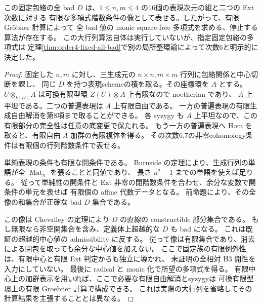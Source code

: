 \begin{corollary}[悪い中心値を与える有限代数データ]
\label{cor:order4-effective-ext-elimination}
この固定包絡の全 bad $D$ は、$1\le n,m\le4$ の16個の表現次元の組と二つの Ext 次数に対する
有限な多項式階数条件の像として表せる。したがって、有限 Gröbner 計算によって
全 bad 値の monic square-free 多項式を求める、停止する算法が存在する。
この大行列算法自体は実行していないが、指定固定包絡の多項式は
定理\ref{thm:order4-fixed-all-bad}で別の局所整環論によって次数6と明示的に決定した。
\end{corollary}
\begin{proof}
固定した $n,m$ に対し、三生成元の $n\times n,m\times m$ 行列に包絡関係と中心切断を課し、
同じ $D$ を持つ表現schemeの積を取る。その座標環を $A$ とする。
$U\otimes_{k[D]}A$ は可換有限型環 $Z(U)\otimes A$ 上有限なので noetherian であり、
$A$ 上平坦である。二つの普遍表現は $A$ 上有限自由である。
一方の普遍表現の有限生成自由解消を第8項まで取ることができる。
各 syzygy も $A$ 上平坦なので、この有限部分の完全性は任意の底変更で保たれる。
もう一方の普遍表現へ Hom を取ると、有限自由 $A$ 加群の有限複体を得る。
その次数6,7の非零cohomology条件は有限個の行列階数条件で表せる。

単純表現の条件も有限な開条件である。
Burnside の定理により、生成行列の単語が全 $\operatorname{Mat}_n$ を張ることと同値であり、
長さ $n^2-1$ までの単語を使えば足りる。
従って単純性の開条件と Ext 非零の閉階数条件を合わせ、余分な変数で開条件の単元を表せば
有限個の affine 代数データとなる。
前命題により、その全像の和集合が正確な bad $D$ 集合である。

この像は Chevalley の定理により $D$ の直線の constructible 部分集合である。
もし無限なら非空開集合を含み、定義体上超越的な $D$ も bad になる。
これは既証の超越的中心値の admissibility に反する。
従って像は有限集合であり、消去による閉包を取っても余分な中心値を加えない。
ここで固定族の有限例外性は、有限中心と有限 Ext 判定からも独立に導かれ、
未証明の全相対 H3 開性を入力にしていない。
最後に radical と monic 化で所望の多項式を得る。
有限中心上の加群表示を用いれば、ここで必要な有限自由解消とsyzygyは
可換有限型環上の有限 Groebner 計算で構成できる。
これは実際の大行列を省略してその計算結果を主張することとは異なる。
\end{proof}
